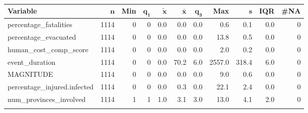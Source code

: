\begingroup\footnotesize
\begin{longtable}{lrrrrrrrrrr}
 \textbf{Variable} & $\mathbf{n}$ & \textbf{Min} & $\mathbf{q_1}$ & $\mathbf{\widetilde{x}}$ & $\mathbf{\bar{x}}$ & $\mathbf{q_3}$ & \textbf{Max} & $\mathbf{s}$ & \textbf{IQR} & \textbf{\#NA} \\ 
  \hline
percentage\_fatalities & 1114 & 0 & 0 & 0.0 &  0.0 & 0.0 &    0.6 &   0.1 & 0.0 & 0 \\ 
  percentage\_evacuated & 1114 & 0 & 0 & 0.0 &  0.0 & 0.0 &   13.8 &   0.5 & 0.0 & 0 \\ 
  human\_cost\_comp\_score & 1114 & 0 & 0 & 0.0 &  0.0 & 0.0 &    2.0 &   0.2 & 0.0 & 0 \\ 
  event\_duration & 1114 & 0 & 0 & 0.0 & 70.2 & 6.0 & 2557.0 & 318.4 & 6.0 & 0 \\ 
  MAGNITUDE & 1114 & 0 & 0 & 0.0 &  0.0 & 0.0 &    9.0 &   0.6 & 0.0 & 0 \\ 
  percentage\_injured.infected & 1114 & 0 & 0 & 0.0 &  0.3 & 0.0 &   22.1 &   2.4 & 0.0 & 0 \\ 
  num\_provinces\_involved & 1114 & 1 & 1 & 1.0 &  3.1 & 3.0 &   13.0 &   4.1 & 2.0 & 0 \\ 
  \hline
\caption{} 
\label{}
\end{longtable}
\endgroup
